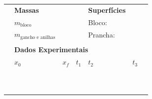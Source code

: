 \begin{table}[!ht]
\centering
\begin{tabular}{lp{25mm}p{25mm}p{25mm}p{25mm}p{25mm}l}
\toprule
    & \textbf{Massas} & & & \textbf{Superfícies} \\
    \cmidrule{2-3} \cmidrule{5-6}
    & \cellcolor[gray]{0.89} $m_{\text{bloco}}$ & \cellcolor[gray]{0.92} & & \cellcolor[gray]{0.89} Bloco: & \cellcolor[gray]{0.92} \\
    & \cellcolor[gray]{0.95} $m_{\text{gancho e anilhas}}$ & \cellcolor[gray]{0.97} & & \cellcolor[gray]{0.95} Prancha: & \cellcolor[gray]{0.97} \\
    \cmidrule{2-3} \cmidrule{5-6}
    \\
	&\multicolumn{4}{l}{\textbf{Dados Experimentais}} \\
	\cmidrule{2-6}
	& $x_0$ & $x_f$ & $t_1$ & $t_2$ & $t_3$ & \\
	\cmidrule{2-6}
	& \cellcolor[gray]{0.89} & \cellcolor[gray]{0.92} & \cellcolor[gray]{0.89} & \cellcolor[gray]{0.92} & \cellcolor[gray]{0.89} \\
	& \cellcolor[gray]{0.95} & \cellcolor[gray]{0.97} & \cellcolor[gray]{0.95} & \cellcolor[gray]{0.97} & \cellcolor[gray]{0.95} \\
	& \cellcolor[gray]{0.89} & \cellcolor[gray]{0.92} & \cellcolor[gray]{0.89} & \cellcolor[gray]{0.92} & \cellcolor[gray]{0.89} \\
	& \cellcolor[gray]{0.95} & \cellcolor[gray]{0.97} & \cellcolor[gray]{0.95} & \cellcolor[gray]{0.97} & \cellcolor[gray]{0.95} \\
	& \cellcolor[gray]{0.89} & \cellcolor[gray]{0.92} & \cellcolor[gray]{0.89} & \cellcolor[gray]{0.92} & \cellcolor[gray]{0.89} \\
	& \cellcolor[gray]{0.95} & \cellcolor[gray]{0.97} & \cellcolor[gray]{0.95} & \cellcolor[gray]{0.97} & \cellcolor[gray]{0.95} \\
	& \cellcolor[gray]{0.89} & \cellcolor[gray]{0.92} & \cellcolor[gray]{0.89} & \cellcolor[gray]{0.92} & \cellcolor[gray]{0.89} \\
	& \cellcolor[gray]{0.95} & \cellcolor[gray]{0.97} & \cellcolor[gray]{0.95} & \cellcolor[gray]{0.97} & \cellcolor[gray]{0.95} \\
	& \cellcolor[gray]{0.89} & \cellcolor[gray]{0.92} & \cellcolor[gray]{0.89} & \cellcolor[gray]{0.92} & \cellcolor[gray]{0.89} \\
	& \cellcolor[gray]{0.95} & \cellcolor[gray]{0.97} & \cellcolor[gray]{0.95} & \cellcolor[gray]{0.97} & \cellcolor[gray]{0.95} \\

\end{tabular}
\end{table}
